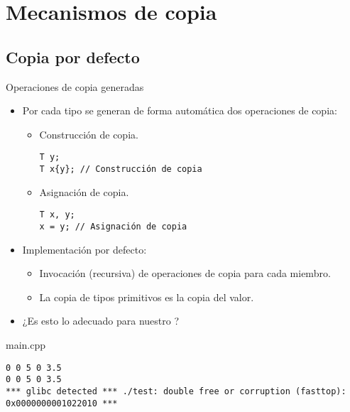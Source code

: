 \section{Mecanismos de copia}

\subsection{Copia por defecto}

\begin{frame}[fragile]{Operaciones de copia generadas}
\begin{itemize}
  \item Por cada tipo se generan de forma automática dos operaciones de copia:
    \begin{itemize}
      \item Construcción de copia.
\begin{lstlisting}
T y;
T x{y}; // Construcción de copia
\end{lstlisting}
      \item Asignación de copia.
\begin{lstlisting}
T x, y;
x = y; // Asignación de copia
\end{lstlisting}
    \end{itemize}
  \item Implementación por defecto:
    \begin{itemize}
      \item Invocación (recursiva) de operaciones de copia para cada miembro.
      \item La copia de tipos primitivos es la copia del valor.
    \end{itemize}
  \item ¿Es esto lo adecuado para nuestro ?
\end{itemize}
\end{frame}

\begin{frame}[fragile]
\begin{block}{main.cpp}

\end{block}
\begin{lstlisting}[style=terminal]
0 0 5 0 3.5 
0 0 5 0 3.5 
*** glibc detected *** ./test: double free or corruption (fasttop): 
0x0000000001022010 ***
\end{lstlisting}
\end{frame}

